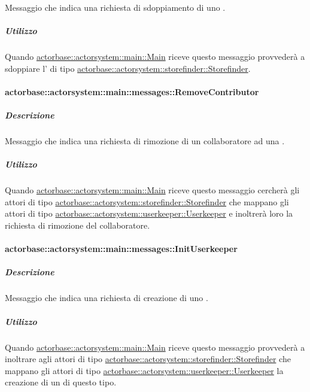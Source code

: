 \documentclass{scalatekids-article}
\begin{document}
Messaggio che indica una richiesta di sdoppiamento di uno .

\subparagraph{Utilizzo}

Quando \hyperref[sec:actorbase::actorsystem::main::Main]{actorbase::actorsystem::main::Main}
riceve questo messaggio provvederà a sdoppiare l' di tipo
\hyperref[sec:actorbase::actorsystem::storefinder::Storefinder]{actorbase::actorsystem::\allowbreak{}storefinder::\allowbreak{}Storefinder}.

\paragraph{actorbase::actorsystem::main::messages::RemoveContributor}
\label{sec:actorbase::actorsystem::main::messages::RemoveContributor}

\subparagraph{Descrizione}

Messaggio che indica una richiesta di rimozione di un collaboratore ad una
.

\subparagraph{Utilizzo}

Quando \hyperref[sec:actorbase::actorsystem::main::Main]{actorbase::actorsystem::main::Main}
riceve questo messaggio cercherà gli attori di tipo
\hyperref[sec:actorbase::actorsystem::storefinder::Storefinder]{actorbase::actorsystem::\allowbreak{}storefinder::\allowbreak{}Storefinder}
che mappano gli attori di tipo \hyperref[sec:actorbase::actorsystem::storefinder::Storefinder]{actorbase::actorsystem::\allowbreak{}userkeeper::\allowbreak{}Userkeeper}
e inoltrerà loro la richiesta di rimozione del collaboratore.

\paragraph{actorbase::actorsystem::main::messages::InitUserkeeper}
\label{sec:actorbase::actorsystem::main::messages::InitUserkeeper}

\subparagraph{Descrizione}

Messaggio che indica una richiesta di creazione di uno .

\subparagraph{Utilizzo}

Quando \hyperref[sec:actorbase::actorsystem::main::Main]{actorbase::actorsystem::main::Main}
riceve questo messaggio provvederà a inoltrare agli attori di tipo
\hyperref[sec:actorbase::actorsystem::storefinder::Storefinder]{actorbase::actorsystem::\allowbreak{}storefinder::\allowbreak{}Storefinder}
che mappano gli attori di tipo \hyperref[sec:actorbase::actorsystem::storefinder::Storefinder]{actorbase::actorsystem::\allowbreak{}userkeeper::\allowbreak{}Userkeeper}
la creazione di un  di questo tipo.
\end{document}
